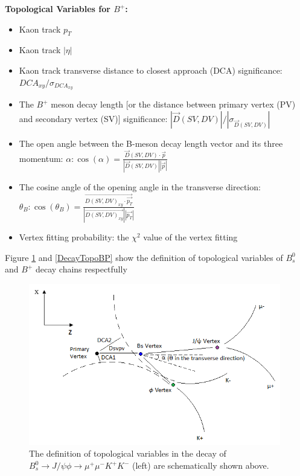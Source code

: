 \textbf{Topological Variables for $B^+$:}
\begin{itemize}
\item Kaon track $p_T$
\item Kaon track $|\eta|$
\item Kaon track transverse distance to closest approach (DCA) significance: $DCA_{xy}/\sigma_{DCA_{xy}}$ 
\item The $B^+$ meson decay length [or the distance between primary vertex (PV) and secondary vertex (SV)] significance: $|\vec{D}(SV,DV)|/|\sigma_{\vec{D}(SV,DV)}|$
\item The open angle between the B-meson decay length vector and its three momentum: $\alpha: \cos(\alpha) = \frac{\vec{D}(SV,DV) \cdot \vec{p}}{|\vec{D}(SV,DV)||\vec{p}|}$
\item The cosine angle of the opening angle in the transverse direction:  $\theta_B: \cos(\theta_B) = \frac{\vec{D(SV,DV)_{xy} \cdot \vec{p_T}}}{|\vec{D(SV,DV)_{xy}}||\vec{p_T}|}$
\item Vertex fitting probability: the $\chi^2$ value of the vertex fitting
\end{itemize}

Figure \ref{DecayTopoBs} and \ref{DecayTopoBP} show the definition of topological variables of $B^0_s$ and $B^+$ decay chains respectfully 

\begin{figure}[h]
\begin{center}
\includegraphics[width= 0.98\textwidth]{Figures/Chapter5/BsDecay.png}
\caption{The definition of topological variables in the decay of $B^0_s \rightarrow J/\psi \phi \rightarrow \mu^+\mu^- K^+K^-$ (left) are schematically shown above.}
\label{DecayTopoBs}
\end{center}
\end{figure}


